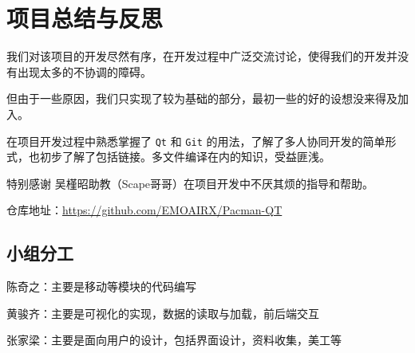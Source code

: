 \documentclass[UTF8,11pt]{ctexart}
\begin{document}
    \section{项目总结与反思}

    我们对该项目的开发尽然有序，在开发过程中广泛交流讨论，使得我们的开发并没有出现太多的不协调的障碍。

    但由于一些原因，我们只实现了较为基础的部分，最初一些的好的设想没来得及加入。

    在项目开发过程中熟悉掌握了 \verb|Qt| 和 \verb|Git| 的用法，了解了多人协同开发的简单形式，也初步了解了包括链接。多文件编译在内的知识，受益匪浅。

    特别感谢 吴槿昭助教（Scape哥哥）在项目开发中不厌其烦的指导和帮助。

    仓库地址：\url{https://github.com/EMOAIRX/Pacman-QT}

    \subsection{小组分工}
    
    陈奇之：主要是移动等模块的代码编写

    黄骏齐：主要是可视化的实现，数据的读取与加载，前后端交互

    张家梁：主要是面向用户的设计，包括界面设计，资料收集，美工等
\end{document}
